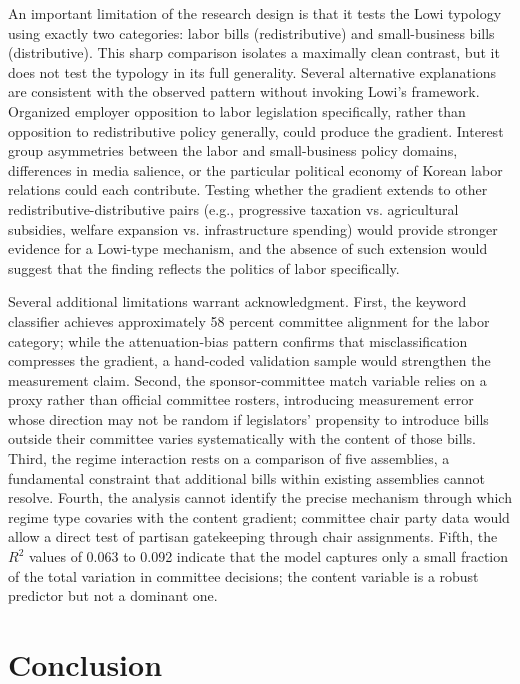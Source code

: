 \documentclass[11pt]{article}
\begin{document}
An important limitation of the research design is that it tests the Lowi typology using exactly two categories: labor bills (redistributive) and small-business bills (distributive). This sharp comparison isolates a maximally clean contrast, but it does not test the typology in its full generality. Several alternative explanations are consistent with the observed pattern without invoking Lowi's framework. Organized employer opposition to labor legislation specifically, rather than opposition to redistributive policy generally, could produce the gradient. Interest group asymmetries between the labor and small-business policy domains, differences in media salience, or the particular political economy of Korean labor relations could each contribute. Testing whether the gradient extends to other redistributive-distributive pairs (e.g., progressive taxation vs. agricultural subsidies, welfare expansion vs. infrastructure spending) would provide stronger evidence for a Lowi-type mechanism, and the absence of such extension would suggest that the finding reflects the politics of labor specifically.

Several additional limitations warrant acknowledgment. First, the keyword classifier achieves approximately 58 percent committee alignment for the labor category; while the attenuation-bias pattern confirms that misclassification compresses the gradient, a hand-coded validation sample would strengthen the measurement claim. Second, the sponsor-committee match variable relies on a proxy rather than official committee rosters, introducing measurement error whose direction may not be random if legislators' propensity to introduce bills outside their committee varies systematically with the content of those bills. Third, the regime interaction rests on a comparison of five assemblies, a fundamental constraint that additional bills within existing assemblies cannot resolve. Fourth, the analysis cannot identify the precise mechanism through which regime type covaries with the content gradient; committee chair party data would allow a direct test of partisan gatekeeping through chair assignments. Fifth, the $R^2$ values of 0.063 to 0.092 indicate that the model captures only a small fraction of the total variation in committee decisions; the content variable is a robust predictor but not a dominant one.


\section{Conclusion}
\label{sec:conclusion}
\end{document}
